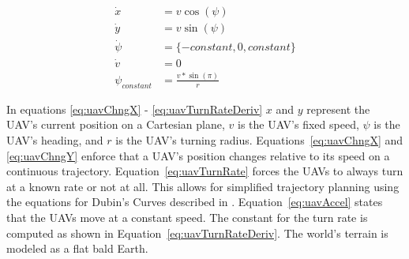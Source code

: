 \begin{align}
\dot{x} &= v \cos(\psi) \label{eq:uavChngX}\\
\dot{y} &= v \sin(\psi) \label{eq:uavChngY}\\
\dot{\psi} &= \{-constant, 0, constant\} \label{eq:uavTurnRate}\\
\dot{v} &= 0 \label{eq:uavAccel}\\
\psi_{constant} &= \frac{v*\sin(\pi)}{r} \label{eq:uavTurnRateDeriv}
\end{align}

In equations \ref{eq:uavChngX} - \ref{eq:uavTurnRateDeriv} $x$ and $y$ represent the UAV's current position on a Cartesian plane, $v$ is the UAV's fixed speed, $\psi$ is the UAV's heading, and $r$ is the UAV's turning radius.  Equations~\ref{eq:uavChngX} and \ref{eq:uavChngY} enforce that a UAV's position changes relative to its speed on a continuous trajectory.  Equation~\ref{eq:uavTurnRate} forces the UAVs to always turn at a known rate or not at all.  This allows for simplified trajectory planning using the equations for Dubin's Curves described in \textcite{dubins}.  Equation~\ref{eq:uavAccel} states that the UAVs move at a constant speed.  The constant for the turn rate is computed as shown in Equation~\ref{eq:uavTurnRateDeriv}.  The world's terrain is modeled as a flat bald Earth.  

